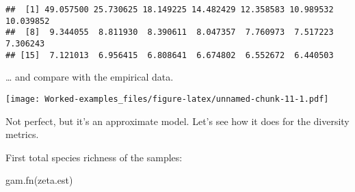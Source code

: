 \documentclass[
]{article}
\newenvironment{Shaded}{\begin{snugshade}}{\end{snugshade}}
\newcommand{\AttributeTok}[1]{\textcolor[rgb]{0.77,0.63,0.00}{#1}}
\newcommand{\ConstantTok}[1]{\textcolor[rgb]{0.00,0.00,0.00}{#1}}
\newcommand{\DecValTok}[1]{\textcolor[rgb]{0.00,0.00,0.81}{#1}}
\newcommand{\FunctionTok}[1]{\textcolor[rgb]{0.00,0.00,0.00}{#1}}
\newcommand{\NormalTok}[1]{#1}
\newcommand{\SpecialCharTok}[1]{\textcolor[rgb]{0.00,0.00,0.00}{#1}}
\newcommand{\StringTok}[1]{\textcolor[rgb]{0.31,0.60,0.02}{#1}}
\begin{document}
\begin{verbatim}
##  [1] 49.057500 25.730625 18.149225 14.482429 12.358583 10.989532 10.039852
##  [8]  9.344055  8.811930  8.390611  8.047357  7.760973  7.517223  7.306243
## [15]  7.121013  6.956415  6.808641  6.674802  6.552672  6.440503
\end{verbatim}

\ldots{} and compare with the empirical data.

\begin{Shaded}
\end{Shaded}

\texttt{[image: Worked-examples\_files/figure-latex/unnamed-chunk-11-1.pdf]}

Not perfect, but it's an approximate model. Let's see how it does for
the diversity metrics.

First total species richness of the samples:

\begin{Shaded}
\begin{Highlighting}[]
\FunctionTok{gam.fn}\NormalTok{(zeta.est)}
\end{Highlighting}
\end{Shaded}
\end{document}
